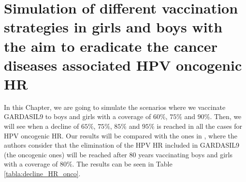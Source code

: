 \section{Simulation of different vaccination strategies in girls and boys with the aim to eradicate the cancer diseases associated HPV oncogenic HR}\label{vaccinationStrategies}
In this Chapter, we are going to simulate the scenarios where we vaccinate GARDASIL9 to boys and girls with a coverage of $60\%$, $75\%$ and $90\%$. Then, we will see when a decline of $65\%$, $75\%$, $85\%$ and $95\%$ is reached in all the cases for HPV oncogenic HR. Our results will be compared with the ones in \cite{Brisson2016}, where the authors consider that the elimination of the HPV HR included in GARDASIL9 (the oncogenic ones) will be reached after $80$ years vaccinating boys and girls with a coverage of $80\%$. The results can be seen in Table \ref{tabla:decline_HR_onco}.

